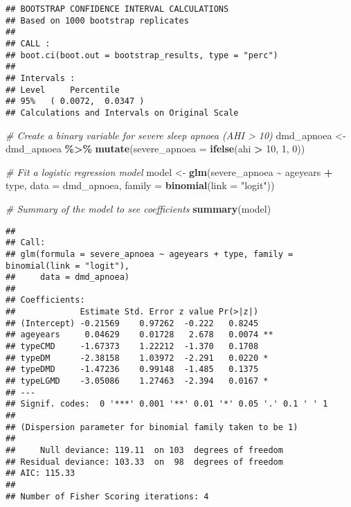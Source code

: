 \documentclass[
]{article}
\newenvironment{Shaded}{\begin{snugshade}}{\end{snugshade}}
\newcommand{\AttributeTok}[1]{\textcolor[rgb]{0.13,0.29,0.53}{#1}}
\newcommand{\CommentTok}[1]{\textcolor[rgb]{0.56,0.35,0.01}{\textit{#1}}}
\newcommand{\DecValTok}[1]{\textcolor[rgb]{0.00,0.00,0.81}{#1}}
\newcommand{\FunctionTok}[1]{\textcolor[rgb]{0.13,0.29,0.53}{\textbf{#1}}}
\newcommand{\NormalTok}[1]{#1}
\newcommand{\OtherTok}[1]{\textcolor[rgb]{0.56,0.35,0.01}{#1}}
\newcommand{\SpecialCharTok}[1]{\textcolor[rgb]{0.81,0.36,0.00}{\textbf{#1}}}
\newcommand{\StringTok}[1]{\textcolor[rgb]{0.31,0.60,0.02}{#1}}
\begin{document}
\begin{verbatim}
## BOOTSTRAP CONFIDENCE INTERVAL CALCULATIONS
## Based on 1000 bootstrap replicates
## 
## CALL : 
## boot.ci(boot.out = bootstrap_results, type = "perc")
## 
## Intervals : 
## Level     Percentile     
## 95%   ( 0.0072,  0.0347 )  
## Calculations and Intervals on Original Scale
\end{verbatim}

\begin{Shaded}
\begin{Highlighting}[]
\CommentTok{\# Create a binary variable for severe sleep apnoea (AHI \textgreater{} 10)}
\NormalTok{dmd\_apnoea }\OtherTok{\textless{}{-}}\NormalTok{ dmd\_apnoea }\SpecialCharTok{\%\textgreater{}\%}
  \FunctionTok{mutate}\NormalTok{(}\AttributeTok{severe\_apnoea =} \FunctionTok{ifelse}\NormalTok{(ahi }\SpecialCharTok{\textgreater{}} \DecValTok{10}\NormalTok{, }\DecValTok{1}\NormalTok{, }\DecValTok{0}\NormalTok{))}

\CommentTok{\# Fit a logistic regression model}
\NormalTok{model }\OtherTok{\textless{}{-}} \FunctionTok{glm}\NormalTok{(severe\_apnoea }\SpecialCharTok{\textasciitilde{}}\NormalTok{ ageyears }\SpecialCharTok{+}\NormalTok{ type, }
             \AttributeTok{data =}\NormalTok{ dmd\_apnoea, }
             \AttributeTok{family =} \FunctionTok{binomial}\NormalTok{(}\AttributeTok{link =} \StringTok{"logit"}\NormalTok{))}

\CommentTok{\# Summary of the model to see coefficients}
\FunctionTok{summary}\NormalTok{(model)}
\end{Highlighting}
\end{Shaded}

\begin{verbatim}
## 
## Call:
## glm(formula = severe_apnoea ~ ageyears + type, family = binomial(link = "logit"), 
##     data = dmd_apnoea)
## 
## Coefficients:
##             Estimate Std. Error z value Pr(>|z|)   
## (Intercept) -0.21569    0.97262  -0.222   0.8245   
## ageyears     0.04629    0.01728   2.678   0.0074 **
## typeCMD     -1.67373    1.22212  -1.370   0.1708   
## typeDM      -2.38158    1.03972  -2.291   0.0220 * 
## typeDMD     -1.47236    0.99148  -1.485   0.1375   
## typeLGMD    -3.05086    1.27463  -2.394   0.0167 * 
## ---
## Signif. codes:  0 '***' 0.001 '**' 0.01 '*' 0.05 '.' 0.1 ' ' 1
## 
## (Dispersion parameter for binomial family taken to be 1)
## 
##     Null deviance: 119.11  on 103  degrees of freedom
## Residual deviance: 103.33  on  98  degrees of freedom
## AIC: 115.33
## 
## Number of Fisher Scoring iterations: 4
\end{verbatim}
\end{document}
